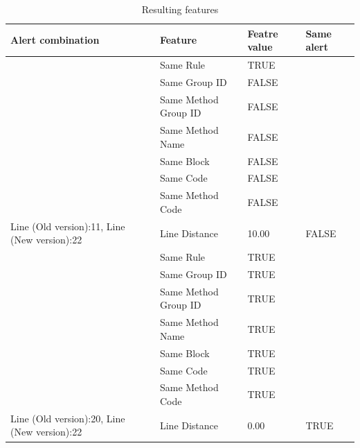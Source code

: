 \documentclass[
]{article}
\begin{document}
\begin{table}[H]

\caption{\label{tab:unnamed-chunk-14}Resulting features\label{table_features_with_decision} }
\centering
\begin{tabular}[t]{l|l|l|l}
\hline
Alert combination & Feature & Featre value & Same alert\\
\hline
\rowcolor{gray!6}  \rowcolor{gray!6}   & Same Rule & TRUE & \\

 & Same Group ID & FALSE & \\

\rowcolor{gray!6}   & Same Method Group ID & FALSE & \\

 & Same Method Name & FALSE & \\

\rowcolor{gray!6}   & Same Block & FALSE & \\

 & Same Code & FALSE & \\

\rowcolor{gray!6}   & Same Method Code & FALSE & \\

\multirow[t]{-8}{*}{\raggedright\arraybackslash Line (Old version):11, Line (New version):22} & Line Distance & 10.00 & \multirow[t]{-8}{*}{\raggedright\arraybackslash FALSE}\\
\cline{1-4}
 & Same Rule & TRUE & \\

 & Same Group ID & TRUE & \\

\rowcolor{gray!6}   & Same Method Group ID & TRUE & \\

 & Same Method Name & TRUE & \\

\rowcolor{gray!6}   & Same Block & TRUE & \\

 & Same Code & TRUE & \\

\rowcolor{gray!6}   & Same Method Code & TRUE & \\

\multirow[t]{-8}{*}{\raggedright\arraybackslash Line (Old version):20, Line (New version):22} & Line Distance & 0.00 & \multirow[t]{-8}{*}{\raggedright\arraybackslash TRUE}\\
\hline
\end{tabular}
\end{table}
\end{document}

